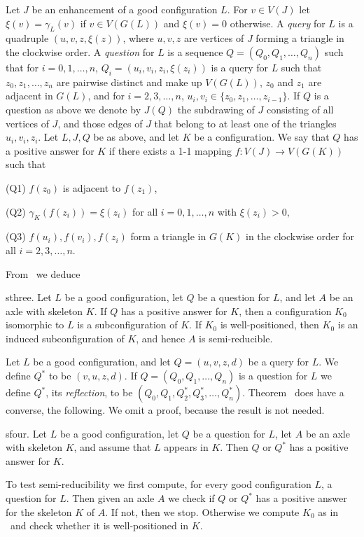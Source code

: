 Let $J$ be an enhancement of a  good configuration $L$.
For $v\in V(J)$ let $\xi (v)=\gamma_L(v)$ if $v\in V(G(L))$ and $\xi(v)=0$ 
otherwise.
A {\it query} for $L$ is a quadruple $(u,v,z,\xi (z))$, where $u,v,z$ 
are vertices of $J$
forming a triangle in the clockwise order.  A {\it question} for 
$L$ is a sequence
$Q=(Q_0,Q_1,\dots, Q_n)$ such that for $i=0,1,\dots, n$,
$Q_i=(u_i,v_i,z_i,\xi  (z_i))$ is
a query for $L$ such that $z_0,z_1,\dots, z_n$ are pairwise
distinct  and make up $V(G(L))$, $z_0$ and $z_1$ are adjacent in 
$G(L)$, and for $i=2,3,\dots, n$, $u_i,v_i\in
\{z_0,z_1,\dots,  z_{i-1}\}$.
If $Q$ is a question as above we denote by $J(Q)$ the subdrawing of $J$ 
consisting of 
all vertices of $J$, and those edges of $J$ that belong to at least
one  of the triangles
$u_i,v_i,z_i$.  Let $L,J,Q$ be as above, and let $K$ be a configuration.  
We say that $Q$
has a positive answer for $K$ if there exists a 1-1 mapping $f:V(J)\to 
V(G(K))$ such that
\item{(Q1)} $f(z_0)$ is adjacent to $f(z_1)$,
\item{(Q2)} $\gamma_K (f(z_i))= \xi (z_i)$ for all $i=0,1,\dots, n$
with  $\xi(z_i)
>0$,
\item{(Q3)} $f(u_i), f(v_i), f(z_i)$ form a triangle in $G(K)$ in the 
clockwise
order for all $i=2,3,\dots, n$.

\noindent From \stwo\ we deduce

\thm sthree.  Let $L$ be a good configuration, let $Q$ be a question 
for $L$, and
let $A$ be an axle with skeleton $K$.  If $Q$ has a positive answer
for  $K$, then a
configuration $K_0$ isomorphic to $L$ is a subconfiguration of $K$.  If 
$K_0$ is well-positioned, 
then $K_0$ is an induced subconfiguration of $K$, and hence $A$ is semi-reducible.  

Let $L$ be a good configuration, and let $Q=(u,v,z,d)$ be a query for 
$L$.  We define
$Q^*$ to be $(v,u,z,d)$.  If $Q=(Q_0,Q_1,\dots, Q_n)$ 
is a question
for $L$ we define $Q^*$, its {\it reflection}, to be
$(Q_0,Q_1,Q^*_2,  Q^*_3,
\dots, Q^*_n)$. Theorem \sthree\ does have a converse, the following.  
We omit a proof, because the result is not needed.

\thm sfour.  Let $L$ be a good configuration, let $Q$ be a question for 
$L$, let $A$
be an axle with skeleton $K$, and assume that $L$ appears in $K$.  Then 
$Q$ or $Q^*$ 
has a positive answer for $K$.

To test semi-reducibility we first compute, for every good configuration 
$L$, a question for $L$.  Then given an axle $A$ we check if $Q$ or
$Q^*$ has  a positive
answer for the skeleton $K$ of $A$.  If not, then we stop.  Otherwise 
we compute
$K_0$ as in \sthree\ and check whether it is well-positioned in $K$.

